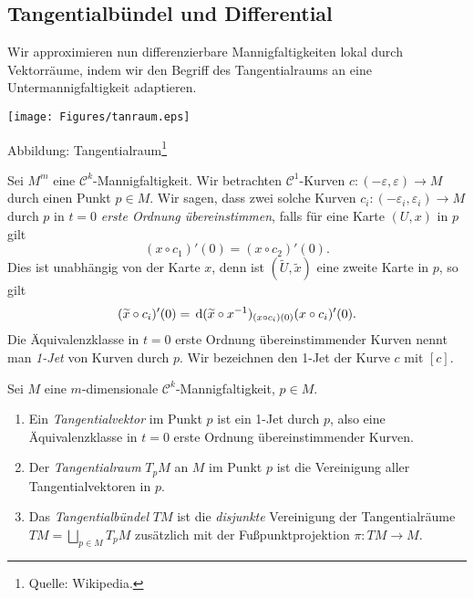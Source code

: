 \subsection{Tangentialbündel und Differential}
Wir approximieren nun differenzierbare Mannigfaltigkeiten lokal durch Vektorräume, indem wir den Begriff des Tangentialraums an eine Untermannigfaltigkeit adaptieren.
\begin{center}
\texttt{[image: Figures/tanraum.eps]}\\
\begin{small}
Abbildung: Tangentialraum\footnote{Quelle: Wikipedia.}
\end{small}
\end{center}
Sei $M^m$ eine $\mathcal{C}^k$-Mannigfaltigkeit. Wir betrachten $\mathcal{C}^1$-Kurven $c:(-\varepsilon,\varepsilon)\to M$ durch einen Punkt $p\in M$. Wir sagen, dass zwei solche Kurven $c_i:(-\varepsilon_i,\varepsilon_i) \to M$ durch $p$ in $t=0$ \emph{erste Ordnung übereinstimmen}, falls für eine Karte $(U,x)$ in $p$ gilt
$$(x\circ c_1)'(0)=(x\circ c_2)'(0).$$
Dies ist unabhängig von der Karte $x$, denn ist $(\widetilde{U},\widetilde{x})$ eine zweite Karte in $p$, so gilt
\begin{equation}\label{unabh-karte}
(\widetilde{x}\circ c_i)'(0) = \, \mathrm{d}(\widetilde{x}\circ x^{-1})_{(x\circ c_i)(0)}(x\circ c_i)'(0).
\end{equation}
Die Äquivalenzklasse in $t=0$ erste Ordnung übereinstimmender Kurven nennt man \emph{1-Jet} von Kurven durch $p$. Wir bezeichnen den 1-Jet der Kurve $c$ mit $[c]$.
\begin{definition} 
\begin{mdframed}Sei $M$ eine $m$-dimensionale $\mathcal{C}^k$-Mannigfaltigkeit, $p\in M$.
\begin{enumerate}
\item Ein \emph{Tangentialvektor} im Punkt $p$ ist ein 1-Jet durch $p$, also eine Äquivalenzklasse in $t=0$ erste Ordnung übereinstimmender Kurven.
\item Der \emph{Tangentialraum} $T_pM$ an $M$ im Punkt $p$ ist die Vereinigung aller Tangentialvektoren in $p$.
\item Das \emph{Tangentialbündel} $TM$ ist die \emph{disjunkte} Vereinigung der Tangentialräume $TM=\bigsqcup\limits_{p\in M}T_p M$ zusätzlich mit der Fußpunktprojektion $\pi:TM\to M$.
\end{enumerate}
\end{mdframed}
\end{definition}
